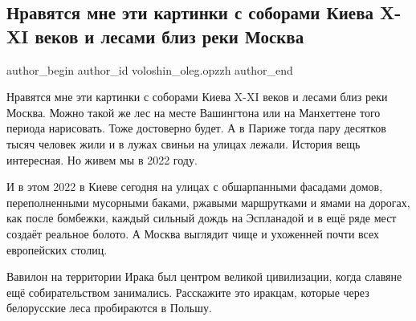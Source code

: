  
 
 
 
 
 
\subsection{Нравятся мне эти картинки с соборами Киева X-XI веков и лесами близ реки Москва}
\label{sec:22_02_2022.fb.voloshin_oleg.opzzh.1.kartinki_kiev_moskva}
 
\ifcmt
 author_begin
   author_id voloshin_oleg.opzzh
 author_end
\fi

Нравятся мне эти картинки с соборами Киева X-XI веков и лесами близ реки
Москва. Можно такой же лес на месте Вашингтона или на Манхеттене того периода
нарисовать. Тоже достоверно будет. А в Париже тогда пару десятков тысяч человек
жили и в лужах свиньи на улицах лежали. История вещь интересная. Но живем мы в
2022 году. 

И в этом 2022 в Киеве сегодня на улицах с обшарпанными фасадами домов,
переполненными мусорными баками, ржавыми маршрутками и ямами на дорогах, как
после бомбежки, каждый сильный дождь на Эспланадой и в ещё ряде мест создаёт
реальное болото. А Москва выглядит чище и ухоженней почти всех европейских
столиц. 

Вавилон на территории Ирака был центром великой цивилизации, когда славяне ещё
собирательством занимались. Расскажите это иракцам, которые через белорусские
леса пробираются в Польшу.

